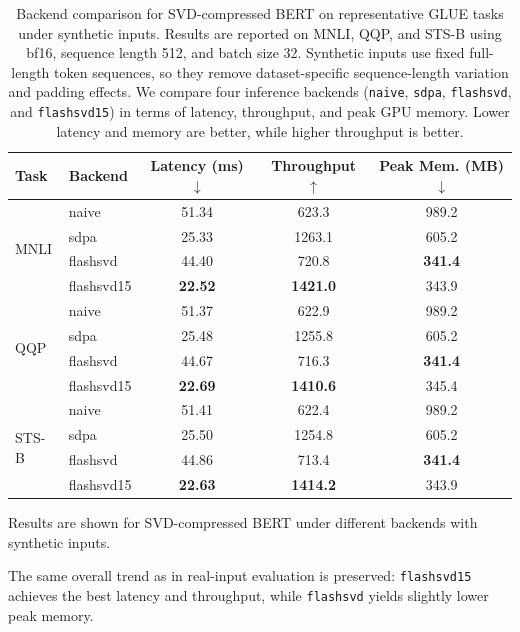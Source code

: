 \begin{table}[t]
\centering
\small
\setlength{\tabcolsep}{4pt}
\renewcommand{\arraystretch}{1.10}
\begin{threeparttable}
\caption{
Backend comparison for SVD-compressed BERT on representative GLUE tasks under synthetic inputs.
Results are reported on MNLI, QQP, and STS-B using bf16, sequence length 512, and batch size 32.
Synthetic inputs use fixed full-length token sequences, so they remove dataset-specific sequence-length variation and padding effects.
We compare four inference backends (\texttt{naive}, \texttt{sdpa}, \texttt{flashsvd}, and \texttt{flashsvd15}) in terms of latency, throughput, and peak GPU memory.
Lower latency and memory are better, while higher throughput is better.
}
\label{tab:svd_backend_tasks_synthetic}
\begin{tabular}{llccc}
\toprule
Task & Backend & Latency (ms) $\downarrow$ & Throughput $\uparrow$ & Peak Mem. (MB) $\downarrow$ \\
\midrule
\multirow{4}{*}{MNLI}
& naive      & 51.34 & 623.3  & 989.2 \\
& sdpa       & 25.33 & 1263.1 & 605.2 \\
& flashsvd   & 44.40 & 720.8  & \textbf{341.4} \\
& flashsvd15 & \textbf{22.52} & \textbf{1421.0} & 343.9 \\
\midrule
\multirow{4}{*}{QQP}
& naive      & 51.37 & 622.9  & 989.2 \\
& sdpa       & 25.48 & 1255.8 & 605.2 \\
& flashsvd   & 44.67 & 716.3  & \textbf{341.4} \\
& flashsvd15 & \textbf{22.69} & \textbf{1410.6} & 345.4 \\
\midrule
\multirow{4}{*}{STS-B}
& naive      & 51.41 & 622.4  & 989.2 \\
& sdpa       & 25.50 & 1254.8 & 605.2 \\
& flashsvd   & 44.86 & 713.4  & \textbf{341.4} \\
& flashsvd15 & \textbf{22.63} & \textbf{1414.2} & 343.9 \\
\bottomrule
\end{tabular}
\begin{tablenotes}[flushleft]
\footnotesize
\item Results are shown for SVD-compressed BERT under different backends with synthetic inputs.
\item The same overall trend as in real-input evaluation is preserved: \texttt{flashsvd15} achieves the best latency and throughput, while \texttt{flashsvd} yields slightly lower peak memory.
\end{tablenotes}
\end{threeparttable}
\end{table}
